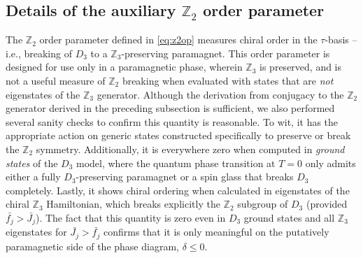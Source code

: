 \documentclass[prb,aps, twocolumn, superscriptaddress]{revtex4-1}
\begin{document}
\begin{appendix}
\subsection{Details of the auxiliary $\mathbb{Z}_2$ order parameter} \label{subsec:auxZ2} 
The $\mathbb{Z}_2$ order parameter defined in \eqref{eq:z2op} measures chiral order in the $\tau$-basis -- i.e., breaking of $D_3$ to a $\mathbb{Z}_3$-preserving paramagnet. 
 This order parameter is designed for use only in a paramagnetic phase, wherein $\mathbb{Z}_3$ is preserved, and is not a useful measure of $\mathbb{Z}_2$ breaking when evaluated with states that are \emph{not} eigenstates of the $\mathbb{Z}_3$ generator. Although the derivation from conjugacy to the $\mathbb{Z}_2$ generator derived in the preceding subsection is sufficient, we also performed several sanity checks to confirm this quantity is reasonable. To wit, it has the appropriate action on generic states constructed specifically to preserve or break the $\mathbb{Z}_2$ symmetry. Additionally, it is everywhere zero when computed in \emph{ground states} of the $D_3$ model, where the quantum phase transition at $T=0$ only admits either a fully $D_3$-preserving paramagnet or a spin glass that breaks $D_3$ completely. Lastly, it shows chiral ordering when calculated in eigenstates of the chiral $\mathbb{Z}_3$ Hamiltonian, which breaks explicitly the $\mathbb{Z}_2$ subgroup of $D_3$ (provided $\bar{f_j} > \bar{J_j}$). The fact that this quantity is zero even in $D_3$ ground states and all $\mathbb{Z}_3$ eigenstates for $\bar{J_j}>\bar{f_j}$ confirms that it is only meaningful on the putatively paramagnetic side of the phase diagram, $\delta \leq 0$.




\end{appendix}
\end{document}
